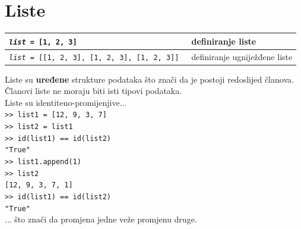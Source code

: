 \documentclass[10pt]{article}
\begin{document}
    \section*{\color{NavyBlue} Liste}
    \begin{tabular}{|>{\tt}p{9.00cm}|>{}p{15.50cm}|}
        \hline
        \textit{list} = [1, 2, 3] & definiranje liste
        \\ \hline
        \textit{list} = [[1, 2, 3], [1, 2, 3], [1, 2, 3]] & definiranje ugniježđene liste
        \\ \hline
    \end{tabular}
    \begin{center}
        \footnotesize
        Liste su \textbf{uređene} strukture podataka što znači da je postoji redoslijed članova. \\
        Članovi liste ne moraju biti isti tipovi podataka. \\
        Liste su identiteno-promijenjive... \\
        \texttt{>> list1 = [12, 9, 3, 7]} \\
        \texttt{>> list2 = list1} \\
        \texttt{>> id(list1) == id(list2)} \\
        \texttt{"True"} \\
        \texttt{>> list1.append(1)} \\
        \texttt{>> list2} \\
        \texttt{[12, 9, 3, 7, 1]} \\
        \texttt{>> id(list1) == id(list2)} \\
        \texttt{"True"} \\
        ... što znači da promjena jedne veže promjenu druge.
    \end{center}
\end{document}
